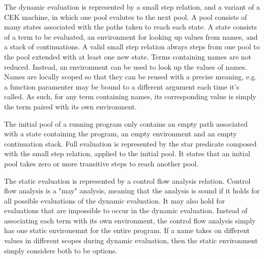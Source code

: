 \documentclass[letterpaper, 11pt]{extarticle}
\begin{document}
The dynamic evaluation is represented by a small step relation, and a variant of a CEK machine, in which one pool evalutes
to the next pool. A pool consists of many states associated with the paths taken to reach each state. A state consists
of a term to be evaluated, an environment for looking up values from names, and a stack of continuations.
A valid small step relation always steps from one pool to the pool extended with at least one new state.
Terms containing names are not reduced. Instead, an environment can be used to look up the values of names.
Names are locally scoped so that they can be reused with a precise meaning, e.g. a function paramenter may be bound to
a different argument each time it's called. As such, for any term containing names, its corresponding value is simply
the term paired with its own environment.

The initial pool of a running program only contains an empty path associated with a state containing the program,
an empty environment and an empty continuation stack.
Full evaluation is represented by the star predicate composed with the small step relation, applied to the initial pool.
It states that an initial pool takes zero or more transitive steps to reach another pool.

The static evaluation is represented by a control flow analysis relation. Control flow analysis is a "may" analysis,
meaning that the analysis is sound if it holds for all possible evaluations of the dynamic evaluation.
It may also hold for evaluations that are impossible to occur in the dynamic evaluation.
Instead of associating each term with its own environment, the control flow analysis simply has one static environemnt
for the entire program. If a name takes on different values in different scopes during dynamic evaluation, then
the static environment simply considers both to be options. 
\end{document}
